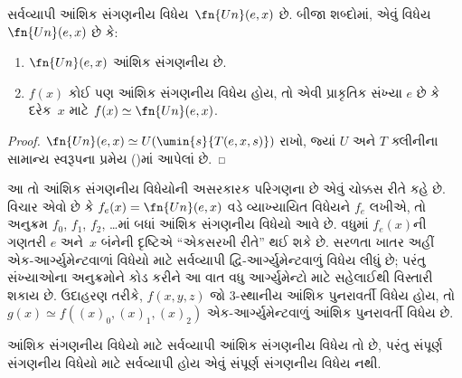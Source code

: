 \begingroup
\makeatletter{}\makeatother

\label{guunit:OLP-0233}


\begin{thm}
સર્વવ્યાપી આંશિક સંગણનીય વિધેય~$\fn{Un}(e,x)$ છે. બીજા શબ્દોમાં,
એવું વિધેય $\fn{Un}(e,x)$ છે કે:
\begin{enumerate}
\item $\fn{Un}(e,x)$ આંશિક સંગણનીય છે.
\item $f(x)$ કોઈ પણ આંશિક સંગણનીય વિધેય હોય, તો એવી
પ્રાકૃતિક સંખ્યા $e$ છે કે દરેક~$x$ માટે $f(x) \simeq \fn{Un}(e,x)$.
\end{enumerate}
\end{thm}

\begin{proof}
$\fn{Un}(e,x) \simeq U(\umin{s}{T(e,x,s)})$ રાખો, જ્યાં $U$ અને $T$
ક્લીનીના સામાન્ય સ્વરૂપના પ્રમેય ()માં
આપેલાં છે.
\end{proof}

\begin{explain}
આ તો આંશિક સંગણનીય વિધેયોની અસરકારક પરિગણના છે એવું ચોક્કસ રીતે
કહે છે. વિચાર એવો છે કે $f_e(x) = \fn{Un}(e,x)$ વડે વ્યાખ્યાયિત
વિધેયને $f_e$ લખીએ, તો અનુક્રમ $f_0$, $f_1$, $f_2$, \dots માં બધાં
આંશિક સંગણનીય વિધેયો આવે છે. વધુમાં $f_e(x)$ની ગણતરી $e$ અને~$x$
બંનેની દૃષ્ટિએ ``એકસરખી રીતે'' થઈ શકે છે. સરળતા ખાતર અહીં એક-આર્ગ્યુમેન્ટવાળાં
વિધેયો માટે સર્વવ્યાપી દ્વિ-આર્ગ્યુમેન્ટવાળું વિધેય લીધું છે; પરંતુ
સંખ્યાઓના અનુક્રમોને કોડ કરીને આ વાત વધુ આર્ગ્યુમેન્ટો માટે સહેલાઈથી
વિસ્તારી શકાય છે. ઉદાહરણ તરીકે, $f(x,y,z)$ જો $3$-સ્થાનીય આંશિક
પુનરાવર્તી વિધેય હોય, તો $g(x) \simeq f((x)_0, (x)_1, (x)_2)$
એક-આર્ગ્યુમેન્ટવાળું આંશિક પુનરાવર્તી વિધેય છે.
\end{explain}
\endgroup


\begingroup
\makeatletter{}\makeatother

\label{guunit:OLP-0234}


આંશિક સંગણનીય વિધેયો માટે સર્વવ્યાપી આંશિક સંગણનીય વિધેય તો છે,
પરંતુ સંપૂર્ણ સંગણનીય વિધેયો માટે સર્વવ્યાપી હોય એવું સંપૂર્ણ
સંગણનીય વિધેય નથી.

